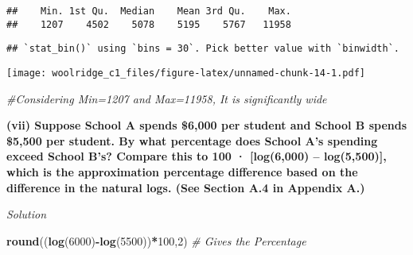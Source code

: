 \documentclass[
]{article}
\newenvironment{Shaded}{\begin{snugshade}}{\end{snugshade}}
\newcommand{\CommentTok}[1]{\textcolor[rgb]{0.56,0.35,0.01}{\textit{#1}}}
\newcommand{\DataTypeTok}[1]{\textcolor[rgb]{0.13,0.29,0.53}{#1}}
\newcommand{\DecValTok}[1]{\textcolor[rgb]{0.00,0.00,0.81}{#1}}
\newcommand{\KeywordTok}[1]{\textcolor[rgb]{0.13,0.29,0.53}{\textbf{#1}}}
\newcommand{\NormalTok}[1]{#1}
\newcommand{\OperatorTok}[1]{\textcolor[rgb]{0.81,0.36,0.00}{\textbf{#1}}}
\newcommand{\StringTok}[1]{\textcolor[rgb]{0.31,0.60,0.02}{#1}}
\begin{document}
\begin{verbatim}
##    Min. 1st Qu.  Median    Mean 3rd Qu.    Max. 
##    1207    4502    5078    5195    5767   11958
\end{verbatim}

\begin{Shaded}
\end{Shaded}

\begin{verbatim}
## `stat_bin()` using `bins = 30`. Pick better value with `binwidth`.
\end{verbatim}

\texttt{[image: woolridge\_c1\_files/figure-latex/unnamed-chunk-14-1.pdf]}

\begin{Shaded}
\begin{Highlighting}[]
\CommentTok{#Considering Min=1207 and Max=11958, It is significantly wide}
\end{Highlighting}
\end{Shaded}

\textbf{(vii) Suppose School A spends \$6,000 per student and School B
spends \$5,500 per student. By what percentage does School A's spending
exceed School B's? Compare this to 100 · {[}log(6,000) -- log(5,500){]},
which is the approximation percentage difference based on the difference
in the natural logs. (See Section A.4 in Appendix A.)}

\emph{Solution}

\begin{Shaded}
\begin{Highlighting}[]
\KeywordTok{round}\NormalTok{((}\KeywordTok{log}\NormalTok{(}\DecValTok{6000}\NormalTok{)}\OperatorTok{-}\KeywordTok{log}\NormalTok{(}\DecValTok{5500}\NormalTok{))}\OperatorTok{*}\DecValTok{100}\NormalTok{,}\DecValTok{2}\NormalTok{) }\CommentTok{# Gives the Percentage}
\end{Highlighting}
\end{Shaded}
\end{document}
